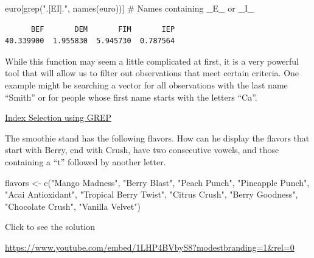 \documentclass[
  letterpaper,
  DIV=11,
  numbers=noendperiod]{scrreprt}
\newenvironment{Shaded}{\begin{snugshade}}{\end{snugshade}}
\newcommand{\CommentTok}[1]{\textcolor[rgb]{0.37,0.37,0.37}{#1}}
\newcommand{\FunctionTok}[1]{\textcolor[rgb]{0.28,0.35,0.67}{#1}}
\newcommand{\NormalTok}[1]{\textcolor[rgb]{0.00,0.23,0.31}{#1}}
\newcommand{\OtherTok}[1]{\textcolor[rgb]{0.00,0.23,0.31}{#1}}
\newcommand{\StringTok}[1]{\textcolor[rgb]{0.13,0.47,0.30}{#1}}
\begin{document}
\begin{Shaded}
\begin{Highlighting}[]
\NormalTok{euro[}\FunctionTok{grep}\NormalTok{(}\StringTok{".[EI]."}\NormalTok{, }\FunctionTok{names}\NormalTok{(euro))] }\CommentTok{\# Names containing \_E\_ or \_I\_}
\end{Highlighting}
\end{Shaded}

\begin{verbatim}
      BEF       DEM       FIM       IEP 
40.339900  1.955830  5.945730  0.787564 
\end{verbatim}

While this function may seem a little complicated at first, it is a very
powerful tool that will allow us to filter out observations that meet
certain criteria. One example might be searching a vector for all
observations with the last name ``Smith'' or for people whose first name
starts with the letters ``Ca''.

\begin{watch}{}{}
    \href{https://youtu.be/BDRppgPi8-E}{Index Selection using GREP}
\end{watch}

\begin{tcolorbox}[enhanced jigsaw, leftrule=.75mm, arc=.35mm, coltitle=black, rightrule=.15mm, bottomrule=.15mm, toprule=.15mm, left=2mm, colbacktitle=quarto-callout-tip-color!10!white, title=\textcolor{quarto-callout-tip-color}{\faLightbulb}\hspace{0.5em}{Try it Out}, toptitle=1mm, breakable, colframe=quarto-callout-tip-color-frame, bottomtitle=1mm, titlerule=0mm, colback=white, opacityback=0, opacitybacktitle=0.6]

The smoothie stand has the following flavors. How can he display the
flavors that start with Berry, end with Crush, have two consecutive
vowels, and those containing a ``t'' followed by another letter.

\begin{Shaded}
\begin{Highlighting}[]
\NormalTok{flavors }\OtherTok{\textless{}{-}} \FunctionTok{c}\NormalTok{(}\StringTok{"Mango Madness"}\NormalTok{, }\StringTok{"Berry Blast"}\NormalTok{, }\StringTok{"Peach Punch"}\NormalTok{, }\StringTok{"Pineapple Punch"}\NormalTok{, }
             \StringTok{"Acai Antioxidant"}\NormalTok{, }\StringTok{"Tropical Berry Twist"}\NormalTok{, }\StringTok{"Citrus Crush"}\NormalTok{, }
             \StringTok{"Berry Goodness"}\NormalTok{, }\StringTok{"Chocolate Crush"}\NormalTok{, }\StringTok{"Vanilla Velvet"}\NormalTok{)}
\end{Highlighting}
\end{Shaded}

Click to see the solution

\url{https://www.youtube.com/embed/1LHP4BVbyS8?modestbranding=1&rel=0}

\end{tcolorbox}
\end{document}
